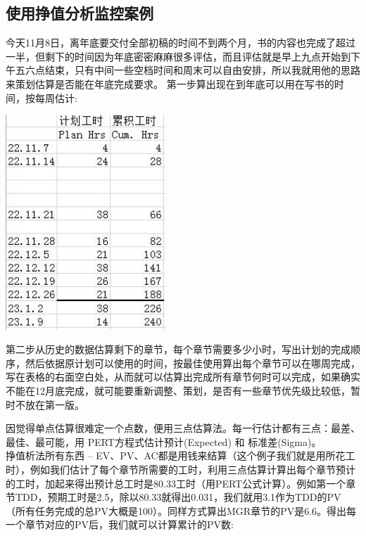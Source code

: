 \hypertarget{ux4f7fux7528pspux6323ux503cux5206ux6790ux76d1ux63a7ux6848ux4f8b}{%
\subsection{使用挣值分析监控案例}\label{ux4f7fux7528pspux6323ux503cux5206ux6790ux76d1ux63a7ux6848ux4f8b}}

今天11月8日，离年底要交付全部初稿的时间不到两个月，书的内容也完成了超过一半，但剩下的时间因为年底密密麻麻很多评估，而且评估就是早上九点开始到下午五六点结束，只有中间一些空档时间和周末可以自由安排，所以我就用他的思路来策划估算是否能在年底完成要求。
第一步算出现在到年底可以用在写书的时间，按每周估计:


\includegraphics[width=6cm]{psp3.jpg}

第二步从历史的数据估算剩下的章节，每个章节需要多少小时，写出计划的完成顺序，然后依据原计划可以使用的时间，按最佳使用算出每个章节可以在哪周完成，写在表格的右面空白处，从而就可以估算出完成所有章节何时可以完成，如果确实不能在12月底完成，就可能要重新调整、策划，是否有一些章节优先级比较低，暂时不放在第一版。

因觉得单点估算很难定一个点数，便用三点估算法。每一行估计都有三点：最差、最佳、最可能，用
PERT方程式估计预计(Expected) 和 标准差(Sigma)。\\
挣值析法所有东西 --
EV、PV、AC都是用钱来结算（这个例子我们就是用所花工时），例如我们估计了每个章节所需要的工时，利用三点估算计算出每个章节预计的工时，加起来得出预计总工时是80.33工时（用PERT公式计算）。例如第一个章节TDD，预期工时是2.5，除以80.33就得出0.031，我们就用3.1作为TDD的PV（所有任务完成的总PV大概是100）。同样方式算出MGR章节的PV是6.6。得出每一个章节对应的PV后，我们就可以计算累计的PV数:


